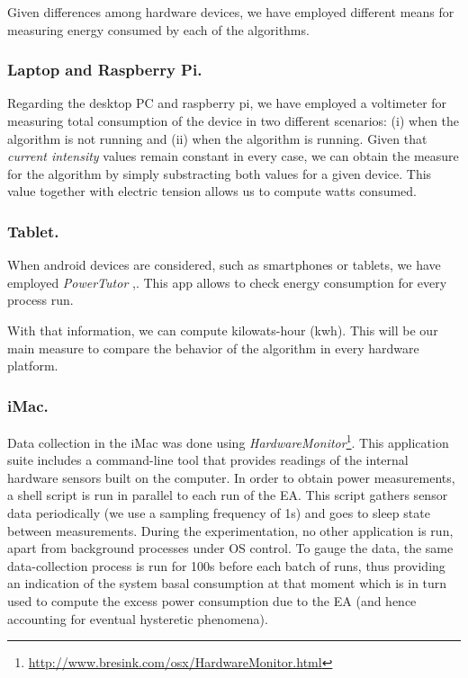 Given differences among hardware devices, we have employed different means  %
for measuring energy consumed by each of the algorithms.  
\subsubsection*{Laptop and Raspberry Pi.}
Regarding the desktop PC and raspberry pi, we have employed a voltimeter for measuring total consumption of the device in two different scenarios:  (i) when the algorithm is not running and (ii) when the algorithm is running.  Given that \textit{current intensity} values remain constant in every case, we can obtain the measure for the algorithm by simply substracting both values for a given device.  This value together with electric tension allows us to compute watts consumed.

\subsubsection*{Tablet.}
When android devices are considered, such as smartphones or tablets, we have employed  \textit{PowerTutor} \cite{powertutor},\cite{powertutor2}. This app allows to check energy consumption for every process run.

With that information, we can compute kilowats-hour (kwh).  This will be our main measure to compare the behavior of the algorithm in every hardware platform.

\subsubsection*{iMac.}
Data collection in the iMac was done using \emph{HardwareMonitor}\footnote{\url{http://www.bresink.com/osx/HardwareMonitor.html}}. 
This application suite includes a command-line tool that provides readings of the internal
hardware sensors built on the computer. In order to obtain power measurements, a shell
script is run in parallel to each run of the EA. This script gathers sensor data periodically
(we use a sampling frequency of 1s) and goes to sleep state between measurements. 
During the experimentation, no other application is run, apart from background processes 
under OS control. 
To gauge the data,
the same data-collection process is run for 100s before each batch of runs, thus providing
an indication of the system basal consumption at that moment which is in turn used to 
compute the excess power consumption due to the EA (and hence accounting for
eventual hysteretic phenomena).

